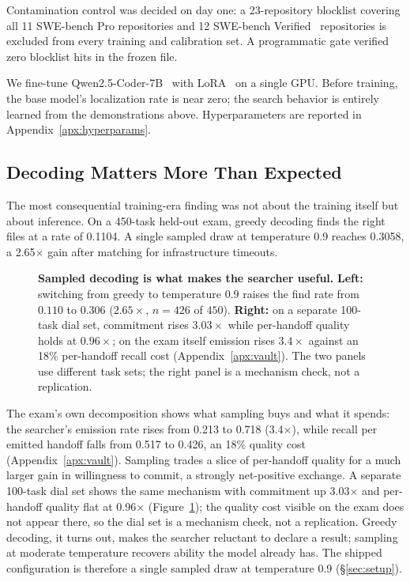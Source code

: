 Contamination control was decided on day one: a 23-repository blocklist
covering all 11 SWE-bench Pro repositories and 12 SWE-bench
Verified~\citep{swebenchverified} repositories is excluded from every
training and calibration set. A
programmatic gate verified zero blocklist hits in the frozen file.

We fine-tune Qwen2.5-Coder-7B~\citep{qwen25coder} with
LoRA~\citep{lora} on a single GPU. Before training, the base model's
localization rate is near zero; the search behavior is entirely learned from
the demonstrations above. Hyperparameters are reported in Appendix~\ref{apx:hyperparams}.

\subsection{Decoding Matters More Than Expected}
\label{sec:decoding}

The most consequential training-era finding was not about the training itself
but about inference. On a 450-task held-out exam, greedy decoding finds the
right files at a rate of 0.1104. A single sampled draw at temperature 0.9
reaches 0.3058, a 2.65$\times$ gain after matching for infrastructure timeouts.

\begin{figure}[!tbp]

\caption{\textbf{Sampled decoding is what makes the searcher useful.}
\textbf{Left:} switching from greedy to temperature $0.9$ raises the
find rate from $0.110$ to $0.306$ ($2.65\times$, $n{=}426$ of $450$).
\textbf{Right:} on a separate 100-task dial set, commitment rises
$3.03\times$ while per-handoff quality holds at $0.96\times$; on the
exam itself emission rises $3.4\times$ against an 18\% per-handoff
recall cost (Appendix~\ref{apx:vault}).  The two panels use different
task sets; the right panel is a mechanism check, not a replication.}
\label{fig:decoding}
\end{figure}

The exam's own decomposition shows what sampling buys and what it
spends: the searcher's emission rate rises from 0.213 to 0.718
(3.4$\times$), while recall per emitted handoff falls from 0.517 to
0.426, an 18\% quality cost (Appendix~\ref{apx:vault}). Sampling trades
a slice of per-handoff quality for a much larger gain in willingness to
commit, a strongly net-positive exchange. A separate 100-task dial set
shows the same mechanism with commitment up 3.03$\times$ and per-handoff
quality flat at 0.96$\times$ (Figure~\ref{fig:decoding}); the quality
cost visible on the exam does not appear there, so the dial set is a
mechanism check, not a replication. Greedy decoding, it turns out,
makes the searcher reluctant to declare a result; sampling at moderate
temperature recovers ability the model already has. The shipped
configuration is therefore a single sampled draw at temperature 0.9
(\S\ref{sec:setup}).

